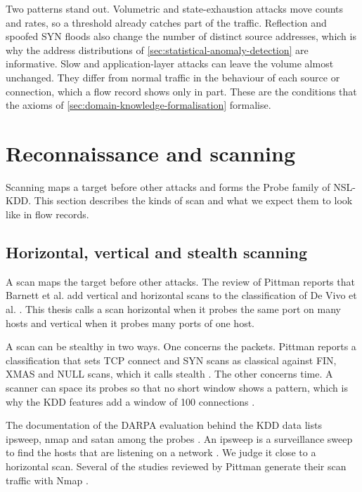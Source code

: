 Two patterns stand out. Volumetric and state-exhaustion attacks move counts
and rates, so a threshold already catches part of the traffic. Reflection and
spoofed SYN floods also change the number of distinct source addresses, which
is why the address distributions of \cref{sec:statistical-anomaly-detection}
are informative. Slow and application-layer attacks can leave the volume
almost unchanged. They differ from normal traffic in the behaviour of each
source or connection, which a flow record shows only in part. These are the
conditions that the axioms of \cref{sec:domain-knowledge-formalisation}
formalise.

\section{Reconnaissance and scanning}
\label{sec:recon-scanning}

Scanning maps a target before other attacks and forms the Probe family of NSL-KDD. This
section describes the kinds of scan and what we expect them to look like in flow records.

\subsection{Horizontal, vertical and stealth scanning}
\label{sec:scan-types}

A scan maps the target before other attacks. The review of Pittman reports
that Barnett et al. add vertical and horizontal scans to the classification of
De Vivo et al. \citep{pittman2023portscans}. This thesis calls a scan horizontal when it
probes the same port on many hosts and vertical when it probes many ports of
one host.

A scan can be stealthy in two ways. One concerns the packets. Pittman reports
a classification that sets TCP connect and SYN scans as classical against FIN,
XMAS and NULL scans, which it calls stealth \citep{pittman2023portscans}. The
other concerns time. A scanner can space its probes so that no short window
shows a pattern, which is why the KDD features add a window of 100
connections \citep{tavallaee2009kddcup99}.

The documentation of the DARPA evaluation behind the KDD data lists ipsweep,
nmap and satan among the probes \citep{kddcup1999task,mitll1998attacks}. An
ipsweep is a surveillance sweep to find the hosts that are listening on a
network \citep{mitll1998attacks}. We judge it close to a horizontal scan. Several of the studies reviewed by Pittman generate their scan
traffic with Nmap \citep{pittman2023portscans}.

